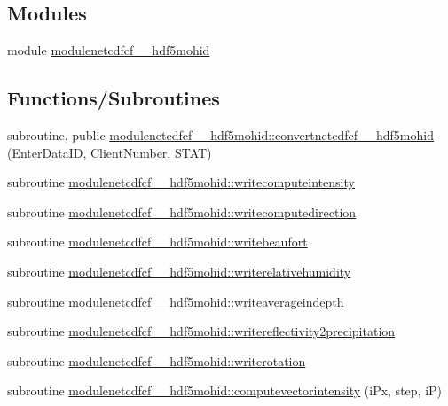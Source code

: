 \subsection*{Modules}
\begin{DoxyCompactItemize}
\item 
module \mbox{\hyperlink{namespacemodulenetcdfcf__2__hdf5mohid}{modulenetcdfcf\+\_\+\_\+hdf5mohid}}
\end{DoxyCompactItemize}
\subsection*{Functions/\+Subroutines}
\begin{DoxyCompactItemize}
\item 
subroutine, public \mbox{\hyperlink{namespacemodulenetcdfcf__2__hdf5mohid_ad44cbe3d10b2660f418505ecaee704cc}{modulenetcdfcf\+\_\+\_\+hdf5mohid\+::convertnetcdfcf\+\_\+\_\+hdf5mohid}} (Enter\+Data\+ID, Client\+Number, S\+T\+AT)
\item 
subroutine \mbox{\hyperlink{namespacemodulenetcdfcf__2__hdf5mohid_a01bd6ffe3872c8015fc8cc1d24e90de8}{modulenetcdfcf\+\_\+\_\+hdf5mohid\+::writecomputeintensity}}
\item 
subroutine \mbox{\hyperlink{namespacemodulenetcdfcf__2__hdf5mohid_ae8ddd77f8739702fc89a6ced3c6794bc}{modulenetcdfcf\+\_\+\_\+hdf5mohid\+::writecomputedirection}}
\item 
subroutine \mbox{\hyperlink{namespacemodulenetcdfcf__2__hdf5mohid_ae5e557cc9dcf221c2e0d2768df186417}{modulenetcdfcf\+\_\+\_\+hdf5mohid\+::writebeaufort}}
\item 
subroutine \mbox{\hyperlink{namespacemodulenetcdfcf__2__hdf5mohid_a2137023763cf82253ee1d5e868541499}{modulenetcdfcf\+\_\+\_\+hdf5mohid\+::writerelativehumidity}}
\item 
subroutine \mbox{\hyperlink{namespacemodulenetcdfcf__2__hdf5mohid_a31008b878c995f8aa06a2f70557abc17}{modulenetcdfcf\+\_\+\_\+hdf5mohid\+::writeaverageindepth}}
\item 
subroutine \mbox{\hyperlink{namespacemodulenetcdfcf__2__hdf5mohid_a349ec5caaf89753f5f078da13ba6a247}{modulenetcdfcf\+\_\+\_\+hdf5mohid\+::writereflectivity2precipitation}}
\item 
subroutine \mbox{\hyperlink{namespacemodulenetcdfcf__2__hdf5mohid_a92d3ed75b91b1a0e6d04680c3dfdbad0}{modulenetcdfcf\+\_\+\_\+hdf5mohid\+::writerotation}}
\item 
subroutine \mbox{\hyperlink{namespacemodulenetcdfcf__2__hdf5mohid_a554c4456ac5359021e717df4e2d16fdf}{modulenetcdfcf\+\_\+\_\+hdf5mohid\+::computevectorintensity}} (i\+Px, step, iP)

\end{DoxyCompactItemize}
